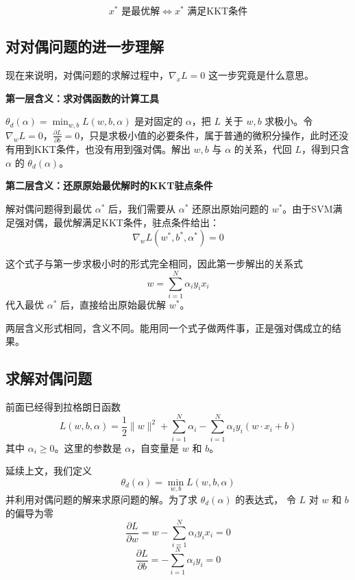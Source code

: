 \begin{equation}
x^*\text{ 是最优解} \iff x^*\text{ 满足KKT条件}
\end{equation}

\subsection{对对偶问题的进一步理解}
 
现在来说明，对偶问题的求解过程中，$\nabla_x L = 0$ 这一步究竟是什么意思。
 
\textbf{第一层含义：求对偶函数的计算工具}
 
$\theta_d(\alpha) = \min_{w,b} L(w,b,\alpha)$ 是对固定的 $\alpha$，把 $L$ 关于 $w,b$ 求极小。令 $\nabla_w L = 0$，$\frac{\partial L}{\partial b}=0$，只是求极小值的必要条件，属于普通的微积分操作，此时还没有用到KKT条件，也没有用到强对偶。解出 $w,b$ 与 $\alpha$ 的关系，代回 $L$，得到只含 $\alpha$ 的 $\theta_d(\alpha)$。
 
\textbf{第二层含义：还原原始最优解时的KKT驻点条件}
 
解对偶问题得到最优 $\alpha^*$ 后，我们需要从 $\alpha^*$ 还原出原始问题的 $w^*$。由于SVM满足强对偶，最优解满足KKT条件，驻点条件给出：
\begin{equation}
\nabla_w L(w^*,b^*,\alpha^*) = 0
\end{equation}
 
这个式子与第一步求极小时的形式完全相同，因此第一步解出的关系式
\begin{equation}
w = \sum_{i=1}^N \alpha_i y_i x_i
\end{equation}
代入最优 $\alpha^*$ 后，直接给出原始最优解 $w^*$。
 
两层含义形式相同，含义不同。能用同一个式子做两件事，正是强对偶成立的结果。

\subsection{求解对偶问题}

前面已经得到拉格朗日函数
\begin{equation}
L(w, b, \alpha) = \frac{1}{2}\|w\|^2 + \sum_{i=1}^{N} \alpha_i - \sum_{i=1}^{N} \alpha_i y_i (w \cdot x_i + b)
\end{equation}
其中 $\alpha_i \geq 0$。这里的参数是 $\alpha$，自变量是 $w$ 和 $b$。

延续上文，我们定义
\begin{equation}
\theta_d(\alpha) = \min_{w,b} L(w, b, \alpha)
\end{equation}
并利用对偶问题的解来求原问题的解。为了求 $\theta_d(\alpha)$ 的表达式，
令 $L$ 对 $w$ 和 $b$ 的偏导为零
\begin{equation}
\frac{\partial L}{\partial w} = w - \sum_{i=1}^{N} \alpha_i y_i x_i = 0
\end{equation}
\begin{equation}
\frac{\partial L}{\partial b} = - \sum_{i=1}^{N} \alpha_i y_i = 0
\end{equation}

